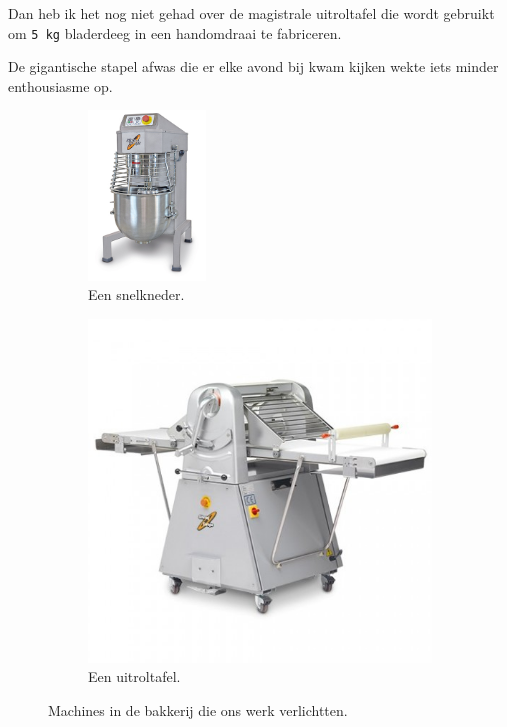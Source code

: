 \documentclass[
  11pt,
  dutch,
]{memoir}
\begin{document}
Dan heb ik het nog niet gehad over de magistrale uitroltafel die wordt
gebruikt om \texttt{5\ kg} bladerdeeg in een handomdraai te fabriceren.

De gigantische stapel afwas die er elke avond bij kwam kijken wekte iets
minder enthousiasme op.

\begin{figure}[h]
    \centering
    \begin{subfigure}{0.4\textwidth}
        \includegraphics[width=0.9\linewidth, height=4.5cm]{img/bw/sinmag.jpg} 
        \caption[Een Sinmag snelkneder.]{Een snelkneder.}
    \end{subfigure}
    \begin{subfigure}{0.5\textwidth}
        \includegraphics[width=0.9\linewidth]{img/bw/uitroltafel.jpg}
        \caption[Een Sinmag uitroltafel.]{Een uitroltafel.}
    \end{subfigure}
    \caption[Machines in de bakkerij. \textcopyright \: Sinmag]{Machines in de bakkerij die ons werk verlichtten.}
\end{figure}
\end{document}
